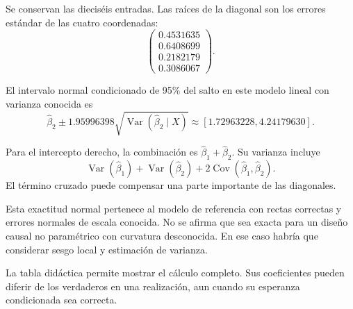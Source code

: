 \documentclass[11pt,a4paper]{article}
\DeclareMathOperator{\Var}{Var}
\DeclareMathOperator{\Cov}{Cov}
\begin{document}
Se conservan las dieciséis entradas.
Las raíces de la diagonal son
los errores estándar de las cuatro coordenadas:
\[
\begin{pmatrix}0.4531635\\0.6408699\\0.2182179\\0.3086067\end{pmatrix}.
\]

El intervalo normal condicionado de 95\%
del salto en este modelo lineal con varianza conocida es
\[
\widehat\beta_2\pm1.95996398\sqrt{\Var(\widehat\beta_2\mid X)}
\approx[1.72963228,4.24179630].
\]

Para el intercepto derecho, la combinación
es \(\widehat\beta_1+\widehat\beta_2\).
Su varianza incluye
\[
\Var(\widehat\beta_1)+\Var(\widehat\beta_2)
+2\Cov(\widehat\beta_1,\widehat\beta_2).
\]
El término cruzado puede compensar
una parte importante de las diagonales.

Esta exactitud normal pertenece al
modelo de referencia con rectas correctas
y errores normales de escala conocida.
No se afirma que sea exacta para
un diseño causal no paramétrico
con curvatura desconocida.
En ese caso habría que considerar
sesgo local y estimación de varianza.

La tabla didáctica permite mostrar
el cálculo completo. Sus coeficientes
pueden diferir de los verdaderos
en una realización, aun cuando
su esperanza condicionada sea correcta.

\clearpage
\end{document}
